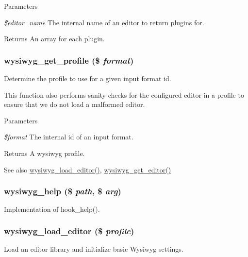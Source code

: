 \begin{DoxyParams}{Parameters}
\item[{\em \$editor\_\-name}]The internal name of an editor to return plugins for.\end{DoxyParams}
\begin{DoxyReturn}{Returns}
An array for each plugin. 
\end{DoxyReturn}
\hypertarget{wysiwyg_8module_aa06388aeffb7f00e3b20466dc40f71b5}{
\subsubsection[{wysiwyg\_\-get\_\-profile}]{\setlength{\rightskip}{0pt plus 5cm}wysiwyg\_\-get\_\-profile (\$ {\em format})}}
\label{wysiwyg_8module_aa06388aeffb7f00e3b20466dc40f71b5}
Determine the profile to use for a given input format id.

This function also performs sanity checks for the configured editor in a profile to ensure that we do not load a malformed editor.


\begin{DoxyParams}{Parameters}
\item[{\em \$format}]The internal id of an input format.\end{DoxyParams}
\begin{DoxyReturn}{Returns}
A wysiwyg profile.
\end{DoxyReturn}
\begin{DoxySeeAlso}{See also}
\hyperlink{wysiwyg_8module_ae494992d10299bda104526267b2cbef0}{wysiwyg\_\-load\_\-editor()}, \hyperlink{group__wysiwyg__api_gaf5c3c86f49f33be930fa6f9b5405a2a6}{wysiwyg\_\-get\_\-editor()} 
\end{DoxySeeAlso}
\hypertarget{wysiwyg_8module_a4926cb9285c08293cd92c520a8161248}{
\subsubsection[{wysiwyg\_\-help}]{\setlength{\rightskip}{0pt plus 5cm}wysiwyg\_\-help (\$ {\em path}, \/  \$ {\em arg})}}
\label{wysiwyg_8module_a4926cb9285c08293cd92c520a8161248}
Implementation of hook\_\-help(). \hypertarget{wysiwyg_8module_ae494992d10299bda104526267b2cbef0}{
\subsubsection[{wysiwyg\_\-load\_\-editor}]{\setlength{\rightskip}{0pt plus 5cm}wysiwyg\_\-load\_\-editor (\$ {\em profile})}}
\label{wysiwyg_8module_ae494992d10299bda104526267b2cbef0}
Load an editor library and initialize basic Wysiwyg settings.


